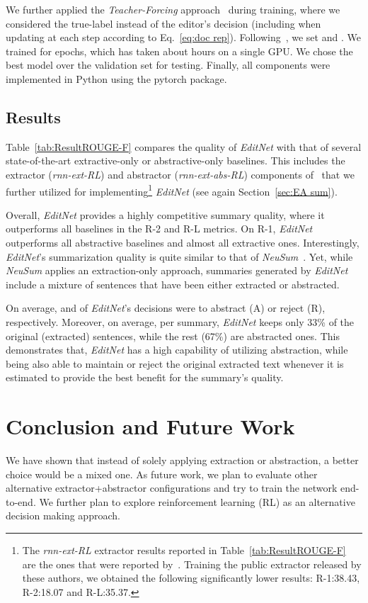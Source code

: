 \documentclass{article}
\begin{document}
We further applied the \textit{Teacher-Forcing} approach~\cite{lamb2016professor} during training, where we considered the true-label instead of the editor's decision (including when updating  at each step  according to Eq.~\ref{eq:doc rep}).
Following~\cite{ChenFastAS2018}, we set  and .
We trained for  epochs, which has taken about  hours on a single GPU. We chose the best model over the validation set for testing. Finally, all components were implemented in Python  using the pytorch  package.

\subsection{Results}
Table~\ref{tab:ResultROUGE-F} compares the quality of \textit{EditNet} with that of several state-of-the-art extractive-only or abstractive-only baselines. This includes the extractor (\textit{rnn-ext-RL}) and abstractor (\textit{rnn-ext-abs-RL}) components of~\cite{ChenFastAS2018} that we further utilized for implementing\footnote{\small The \textit{rnn-ext-RL} extractor results reported in Table~\ref{tab:ResultROUGE-F} are the ones that were reported by~\cite{ChenFastAS2018}. Training the public extractor released by these authors, we obtained the following significantly lower results: R-1:38.43, R-2:18.07 and R-L:35.37.} \textit{EditNet} (see again Section~\ref{sec:EA sum}).

Overall, \textit{EditNet} provides a highly competitive summary quality, where it outperforms all baselines in the R-2 and R-L metrics. On R-1, \textit{EditNet} outperforms all abstractive baselines and almost all extractive ones. 
Interestingly, \textit{EditNet}'s summarization quality is quite similar to that of \textit{NeuSum}~\cite{Qingyu2018}. Yet, while \textit{NeuSum} applies an extraction-only approach, summaries generated by \textit{EditNet} include a mixture of sentences that have been either extracted or abstracted.

On average,  and  of \textit{EditNet}'s decisions were to abstract (\textsf{A}) or reject (\textsf{R}), respectively. Moreover, on average, per summary, \textit{EditNet} keeps only 33\% of the original (extracted) sentences, while the rest (67\%) are abstracted ones. 
This demonstrates that, \textit{EditNet} has a high capability of utilizing abstraction, while being also able to maintain or reject the original extracted text whenever it is estimated to provide the best benefit for the summary's quality.


\section{Conclusion and Future Work}
We have shown that instead of solely applying extraction or abstraction, a better choice would be a mixed one. As future work, we plan to evaluate other alternative extractor+abstractor configurations and try to train the network end-to-end. We further plan to explore reinforcement learning (RL) as an alternative decision making approach.
\end{document}
